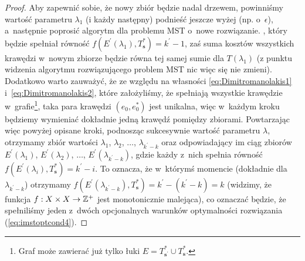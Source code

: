 \begin{proof}
{		Aby zapewnić sobie, że nowy zbiór będzie nadal drzewem, powinniśmy wartość parametru $\lambda_{1}$ (i każdy następny) podnieść jeszcze wyżej (np. o~$\epsilon$), a~następnie poprosić algorytm dla problemu \textsc{MST} o~nowe rozwiązanie.
	}, który będzie spełniał równość $f \left( E^{\prime} \left( \lambda_{1} \right), T^{\ast}_{\textbf{s}} \right) = k^{\prime} - 1$, zaś suma kosztów wszystkich krawędzi w~nowym zbiorze będzie równa tej samej sumie dla $T \left( \lambda_{1} \right)$ (z punktu widzenia algorytmu rozwiązującego problem \textsc{MST} nic więc się nie zmieni).
	Dodatkowo warto zauważyć, że ze względu na własności \ref{eq:Dimitromanolakis1} i~\ref{eq:Dimitromanolakis2}, które założyliśmy, że spełniają wszystkie krawędzie w~grafie\footnote{
		Graf może zawierać już tylko łuki $E = T^{\ast}_{\textbf{s}^{\prime}} \cup T^{\ast}_{\textbf{s}}$.
	}, taka para krawędzi $\left( e_{0}, e_{0}^{\ast} \right)$ jest unikalna, więc w~każdym kroku będziemy wymieniać dokładnie jedną krawędź pomiędzy zbiorami.
	Powtarzając więc powyżej opisane kroki, podnosząc sukcesywnie wartość parametru $\lambda$, otrzymamy zbiór wartości $\lambda_{1}$, $\lambda_{2}$, $\dots$, $\lambda_{k^{\prime} - k}$ oraz odpowiadający im ciąg zbiorów $E^{\prime} \left( \lambda_{1} \right)$, $E^{\prime} \left( \lambda_{2} \right)$, $\dots$, $E^{\prime} \left( \lambda_{k^{\prime} - k} \right)$, gdzie każdy z~nich spełnia równość $f \left( E^{\prime} \left( \lambda_{i} \right), T^{\ast}_{\textbf{s}} \right) = k^{\prime} - i$.
	To oznacza, że w~którymś momencie (dokładnie dla $\lambda_{k^{\prime} - k}$) otrzymamy $f \left( E^{\prime} \left( \lambda_{k^{\prime} - k} \right), T^{\ast}_{\textbf{s}} \right) = k^{\prime} - \left( k^{\prime} - k \right) = k$ (widzimy, że funkcja $f : X \times X \rightarrow \mathbb{Z}^{+}$ jest monotonicznie malejąca), co oznaczać będzie, że spełniliśmy jeden z~dwóch opcjonalnych warunków optymalności rozwiązania (\ref{eq:imstoptcond4}).
\end{proof}

